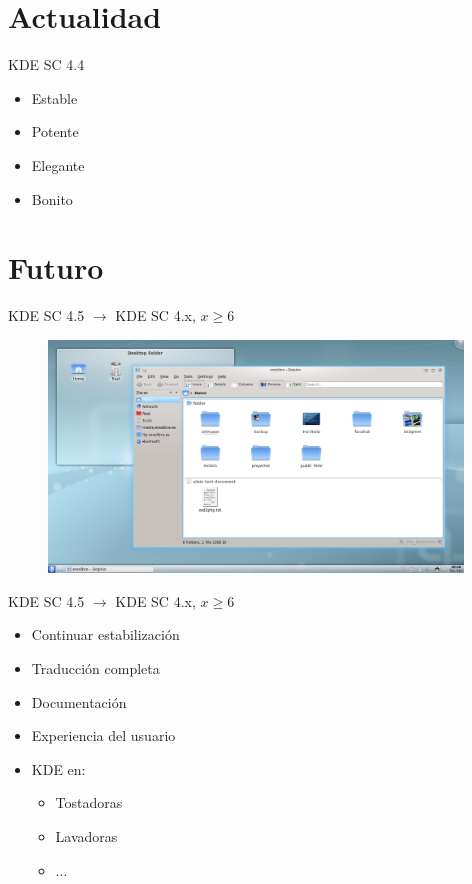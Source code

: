 \documentclass[12pt]{beamer}
\begin{document}
\section{Actualidad}

\begin{frame}{KDE SC 4.4}
    \begin{itemize}
        \item Estable
        \bigskip
        \item Potente
        \bigskip
        \item Elegante
        \bigskip
        \item Bonito
    \end{itemize}
\end{frame}

\section{Futuro}

\begin{frame}{KDE SC 4.5 $\rightarrow$ KDE SC 4.x, $x \ge 6$}
    \center
    \begin{figure}
        \includegraphics[width=11cm]{kde45.png}
    \end{figure}
\end{frame}

\begin{frame}{KDE SC 4.5 $\rightarrow$ KDE SC 4.x, $x \ge 6$}
    \center
    \begin{itemize}
        \item Continuar estabilización
        \bigskip
        \item Traducción completa
        \bigskip
        \item Documentación
        \bigskip
        \item Experiencia del usuario
        \bigskip
        \item KDE en:
        \begin{itemize}
            \item Tostadoras
            \item Lavadoras
            \item ...
        \end{itemize}
    \end{itemize}
\end{frame}
\end{document}
